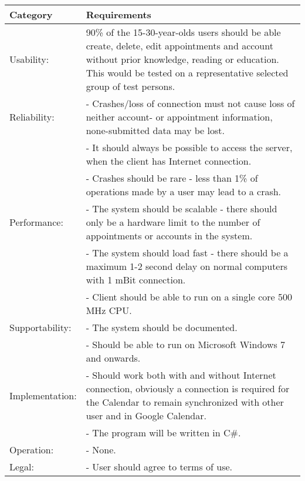 {\tabulinesep=1.2mm
\begin{tabu}{ | p{3cm} | p{13cm} |}
    \hline
    Category	 			& 		Requirements \\\hline
    Usability:	  			& 		90\% of the 15-30-year-olds users should be able create, delete, edit appointments and account without prior knowledge, reading or education. This would be tested on a representative selected group of test persons.\\\hline
    Reliability: 			& 		- Crashes/loss of connection must not cause loss of neither account- or appointment information, none-submitted data may be lost. \\
							&		- It should always be possible to access the server, when the client has Internet connection.\\
							&		- Crashes should be rare - less than 1\% of operations made by a user may lead to a crash. \\ \hline
	Performance:			&		- The system should be scalable - there should only be a hardware limit to the number of appointments or accounts in the system.\\
							&		- The system should load fast - there should be a maximum 1-2 second delay on normal computers with 1 mBit connection.\\
							&		- Client should be able to run on a single core 500 MHz CPU.\\ \hline
    Supportability: 		& 		- The system should be documented.  \\
    						&		- Should be able to run on Microsoft Windows 7 and onwards. \\ \hline
	Implementation: 		&		- Should work both with and without Internet connection, obviously a connection is required for the Calendar to remain synchronized with other user and in Google Calendar.\\
							&		- The program will be written in C\#.\\\hline
	Operation:				&	 	- None. \\\hline
	Legal:					&		- User should agree to terms of use.\\\hline
\end{tabu}
}
